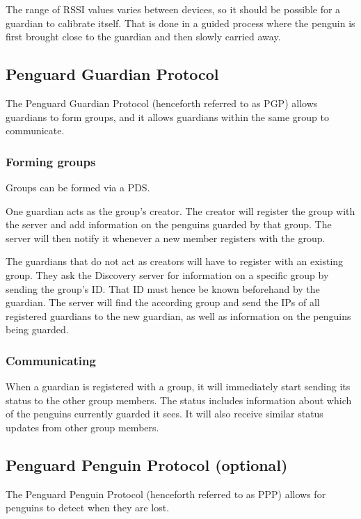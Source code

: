 \documentclass{report}
\begin{document}
The range of RSSI values varies between devices, so it should be possible for a guardian to calibrate itself. That is done in a guided process where the penguin is first brought close to the guardian and then slowly carried away.

\subsection{Penguard Guardian Protocol}

The Penguard Guardian Protocol (henceforth referred to as PGP) allows guardians to form groups, and it allows guardians within the same group to communicate.

\subsubsection{Forming groups}

Groups can be formed via a PDS.

One guardian acts as the group's creator. The creator will register the group with the server and add information on the penguins guarded by that group. The server will then notify it whenever a new member registers with the group.

The guardians that do not act as creators will have to register with an existing group. They ask the Discovery server for information on a specific group by sending the group's ID. That ID must hence be known beforehand by the guardian. The server will find the according group and send the IPs of all registered guardians to the new guardian, as well as information on the penguins being guarded.

\subsubsection{Communicating}

When a guardian is registered with a group, it will immediately start sending its status to the other group members. The status includes information about which of the penguins currently guarded it sees. It will also receive similar status updates from other group members.

\subsection{Penguard Penguin Protocol (optional)}

The Penguard Penguin Protocol (henceforth referred to as PPP) allows for penguins to detect when they are lost.
\end{document}
